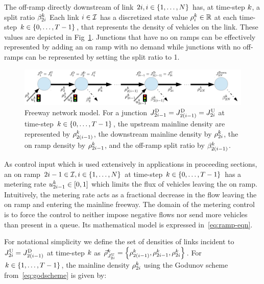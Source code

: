 The off-ramp directly downstream of link $2\link,i\in\intrange 1{\nlinks}$
has, at time-step $k$, a split ratio $\beta_{2i}^{k}$
Each link $i\in\mathcal{I}$ has a discretized state value $\rho_{i}^{k}\in\mathbb{R}$
at each time-step $\tind\in\intrange 0{\ntime-1}$, that represents
the density of vehicles on the link. These values are depicted in
Fig~\ref{fig:Freeway-network-junction}. Junctions that have no
on ramps can be effectively represented by adding an on ramp with no
demand while junctions with no off-ramps can be represented by setting
the split ratio to 1.
\begin{figure}
\centering
\includegraphics[width=1\columnwidth]{previous-articles/adjoint/figs-gen/rm-junction-2}
\caption[Freeway network model depicting the discrete model notation on a single freeway/onramp junction.]{Freeway network model. For a junction $\jdown{2\link-1}=\jdown{2\left(\link-1\right)}=\jup{2\link}$
at time-step $\tind\in\intrange 0{\ntime-1}$, the upstream mainline
density are represented by $\densitydiscrete{2\left(\link-1\right)}{\tind}$,
the downstream mainline density by $\rho_{2i}^{k}$,
the on ramp density by $\rho_{2i-1}^{k}$, and the
off-ramp split ratio by $\splitratio_{2\left(\link-1\right)}^{\tind}$.}
\label{fig:Freeway-network-junction}
\end{figure}

As control input which is used extensively in applications in proceeding sections, an on ramp $2\link-1\in\links,\link\in\intrange 1{\nlinks}$
at time-step $k\in\intrange 0{\ntime-1}$ has a metering rate $\ramp_{2\link-1}^{\tind}\in\left[0,1\right]$
which limits the flux of vehicles leaving the on ramp. Intuitively,
the metering rate acts as a fractional decrease in the flow leaving
the on ramp and entering the mainline freeway. The domain of the metering
control is to force the control to neither impose negative flows nor
send more vehicles than present in a queue. Its mathematical model
is expressed in~\eqref{eq:ramp-eqn}.

For notational simplicity we define the set of densities of links
incident to $\jup{2\link}=\jdown{2\left(\link-1\right)}$ at time-step
$k$ as $\juncstate{\jup{2\link}}{\tind}=\left\{ \discrete{2\left(\link-1\right)}{\tind},\discrete{2i-1}{\tind},\discrete{2\link}{\tind}\right\} $. For $k\in\intrange 1{\ntime-1}$,
the mainline density $\rho_{2i}^{k}$ using the Godunov
scheme from~\eqref{eq:godscheme} is given by:

